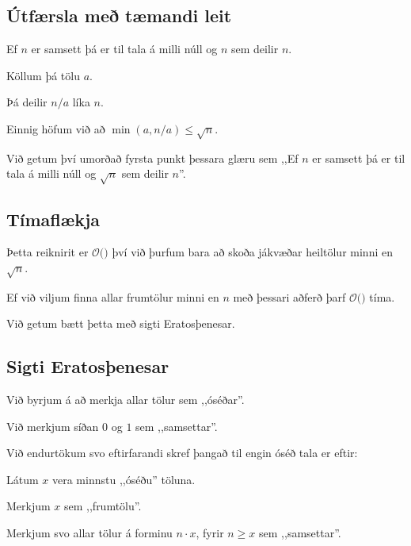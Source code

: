 \subsection{Útfærsla með tæmandi leit}
{
    {
        \item<1-> Ef $n$ er samsett þá er til tala á milli núll og $n$ sem deilir $n$.
        \item<2-> Köllum þá tölu $a$.
        \item<3-> Þá deilir $n/a$ líka $n$.
        \item<4-> Einnig höfum við að $\min(a, n/a) \leq \sqrt{n}$.
        \item<5-> Við getum því umorðað fyrsta punkt þessara glæru sem ,,Ef $n$ er samsett þá er til tala á milli núll og $\sqrt{n}$ sem deilir $n$''.
        \item<6->[] 
    }
}

\subsection{Tímaflækja}
{
    {
        \item<1-> Þetta reiknirit er $\mathcal{O}($$)$ því við þurfum bara að skoða jákvæðar heiltölur minni en $\sqrt{n}$.
        \item<3-> Ef við viljum finna allar frumtölur minni en $n$ með þessari aðferð þarf $\mathcal{O}($$)$ tíma.
        \item<5-> Við getum bætt þetta með sigti Eratosþenesar.
    }
}

\subsection{Sigti Eratosþenesar}
{
    {
        \item<1-> Við byrjum á að merkja allar tölur sem ,,óséðar''.
        \item<2-> Við merkjum síðan $0$ og $1$ sem ,,samsettar''.
        \item<3-> Við endurtökum svo eftirfarandi skref þangað til engin óséð tala er eftir:
        {
            \item<4-> Látum $x$ vera minnstu ,,óséðu'' töluna.
            \item<5-> Merkjum $x$ sem ,,frumtölu''.
            \item<6-> Merkjum svo allar tölur á forminu $n \cdot x$, fyrir $n \geq x$ sem ,,samsettar''.
        }
    }
}

